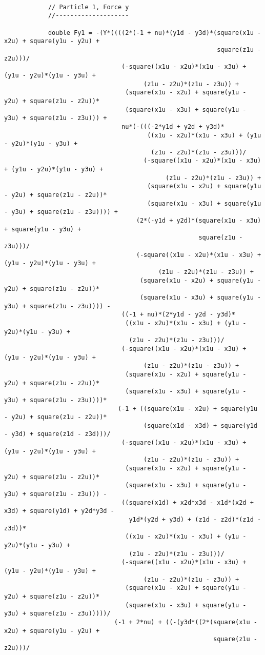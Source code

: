 \begin{lstlisting}
			
			// Particle 1, Force y
			//--------------------
			
			double Fy1 = -(Y*((((2*(-1 + nu)*(y1d - y3d)*(square(x1u - x2u) + square(y1u - y2u) + 
														  square(z1u - z2u)))/
								(-square((x1u - x2u)*(x1u - x3u) + (y1u - y2u)*(y1u - y3u) + 
									  (z1u - z2u)*(z1u - z3u)) + 
								 (square(x1u - x2u) + square(y1u - y2u) + square(z1u - z2u))*
								 (square(x1u - x3u) + square(y1u - y3u) + square(z1u - z3u))) + 
								nu*(-(((-2*y1d + y2d + y3d)*
									   ((x1u - x2u)*(x1u - x3u) + (y1u - y2u)*(y1u - y3u) + 
										(z1u - z2u)*(z1u - z3u)))/
									  (-square((x1u - x2u)*(x1u - x3u) + (y1u - y2u)*(y1u - y3u) + 
											(z1u - z2u)*(z1u - z3u)) + 
									   (square(x1u - x2u) + square(y1u - y2u) + square(z1u - z2u))*
									   (square(x1u - x3u) + square(y1u - y3u) + square(z1u - z3u)))) + 
									(2*(-y1d + y2d)*(square(x1u - x3u) + square(y1u - y3u) + 
													 square(z1u - z3u)))/
									(-square((x1u - x2u)*(x1u - x3u) + (y1u - y2u)*(y1u - y3u) + 
										  (z1u - z2u)*(z1u - z3u)) + 
									 (square(x1u - x2u) + square(y1u - y2u) + square(z1u - z2u))*
									 (square(x1u - x3u) + square(y1u - y3u) + square(z1u - z3u)))) - 
								((-1 + nu)*(2*y1d - y2d - y3d)*
								 ((x1u - x2u)*(x1u - x3u) + (y1u - y2u)*(y1u - y3u) + 
								  (z1u - z2u)*(z1u - z3u)))/
								(-square((x1u - x2u)*(x1u - x3u) + (y1u - y2u)*(y1u - y3u) + 
									  (z1u - z2u)*(z1u - z3u)) + 
								 (square(x1u - x2u) + square(y1u - y2u) + square(z1u - z2u))*
								 (square(x1u - x3u) + square(y1u - y3u) + square(z1u - z3u))))*
							   (-1 + ((square(x1u - x2u) + square(y1u - y2u) + square(z1u - z2u))*
									  (square(x1d - x3d) + square(y1d - y3d) + square(z1d - z3d)))/
								(-square((x1u - x2u)*(x1u - x3u) + (y1u - y2u)*(y1u - y3u) + 
									  (z1u - z2u)*(z1u - z3u)) + 
								 (square(x1u - x2u) + square(y1u - y2u) + square(z1u - z2u))*
								 (square(x1u - x3u) + square(y1u - y3u) + square(z1u - z3u))) - 
								((square(x1d) + x2d*x3d - x1d*(x2d + x3d) + square(y1d) + y2d*y3d - 
								  y1d*(y2d + y3d) + (z1d - z2d)*(z1d - z3d))*
								 ((x1u - x2u)*(x1u - x3u) + (y1u - y2u)*(y1u - y3u) + 
								  (z1u - z2u)*(z1u - z3u)))/
								(-square((x1u - x2u)*(x1u - x3u) + (y1u - y2u)*(y1u - y3u) + 
									  (z1u - z2u)*(z1u - z3u)) + 
								 (square(x1u - x2u) + square(y1u - y2u) + square(z1u - z2u))*
								 (square(x1u - x3u) + square(y1u - y3u) + square(z1u - z3u)))))/
							  (-1 + 2*nu) + ((-(y3d*((2*(square(x1u - x2u) + square(y1u - y2u) + 
														 square(z1u - z2u)))/

\end{lstlisting}

